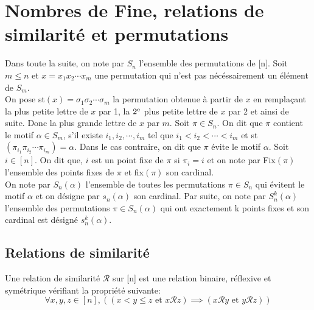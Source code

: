 \chapter{Nombres de Fine, relations de similarité et permutations}
Dans toute la suite, on note par $S_{n}$ l'ensemble des permutations de [n]. Soit $m\leq n$ et $x = x_{1}x_{2}\cdots x_{m} $ une permutation qui n'est pas nécéssairement un élément de $ S_{m} $.\\ On pose st$(x) = \sigma_{1}\sigma_{2}\cdots \sigma_{m}$ la permutation obtenue à partir de $x$ en remplaçant
la plus petite lettre de $x$ par 1, la $2\textsuperscript{e}$ plus petite lettre de $x$ par 2 et ainsi
de suite. Donc la plus grande lettre de $x$ par $m$. Soit $\pi \in S_{n}$. On dit que $\pi $ contient le
motif $\alpha \in S_{m}$, s'il existe $i_{1},i_{2}, \cdots, i_{m}$ tel que $i_{1}<i_{2}< \cdots
	<i_{m}$ et st$(\pi_{i_{1}}\pi_{i_{2}}\cdots \pi_{i_{m}})=\alpha$. Dans le cas contraire, on dit que $\pi$ évite le motif $\alpha$.
Soit $i\in [n]$. On dit que, $i$ est un point fixe de $\pi$ si $\pi_{i}=i$ et on note par Fix$(\pi)$ l'ensemble des points fixes de $\pi$ et fix$(\pi)$ son cardinal.\\ On note par  $S_{n}(\alpha)$ l'ensemble
de toutes les permutations $\pi \in S_{n}$ qui évitent le motif $\alpha$ et on désigne par $s_{n}(\alpha)$ son cardinal. Par suite, on note par $S_{n}^k(\alpha)$ l'ensemble des permutations $\pi \in S_{n}(\alpha)$ qui ont exactement k points fixes et son cardinal est désigné $s_{n}^{k}(\alpha)$.
\vspace{5pt}


\section{Relations de similarité }
\begin{definition}
	\begin{rm}
		Une relation de similarité $\mathcal{R}$ sur [n] est une relation binaire, réflexive et symétrique
		vérifiant la propriété suivante:
		$$\forall x, y, z \in [n], \left((x<y\leq z \text{ et } x\mathcal{R}z) \implies
			(x\mathcal{R}y \text{ et } y\mathcal{R}z)\right) $$
	\end{rm}
\end{definition}


